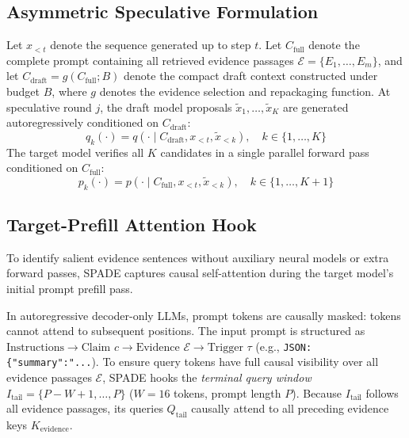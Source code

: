 \documentclass[11pt]{article}
\begin{document}
\subsection{Asymmetric Speculative Formulation}
Let $x_{<t}$ denote the sequence generated up to step $t$. Let $C_{\text{full}}$ denote the complete prompt containing all retrieved evidence passages $\mathcal{E} = \{E_1, \dots, E_m\}$, and let $C_{\text{draft}} = g(C_{\text{full}}; B)$ denote the compact draft context constructed under budget $B$, where $g$ denotes the evidence selection and repackaging function.
At speculative round $j$, the draft model proposals $\tilde{x}_1, \dots, \tilde{x}_K$ are generated autoregressively conditioned on $C_{\text{draft}}$:
\begin{equation}
q_k(\cdot) = q(\cdot \mid C_{\text{draft}}, x_{<t}, \tilde{x}_{<k}), \quad k \in \{1, \dots, K\}
\end{equation}
The target model verifies all $K$ candidates in a single parallel forward pass conditioned on $C_{\text{full}}$:
\begin{equation}
p_k(\cdot) = p(\cdot \mid C_{\text{full}}, x_{<t}, \tilde{x}_{<k}), \quad k \in \{1, \dots, K+1\}
\end{equation}

\subsection{Target-Prefill Attention Hook}
To identify salient evidence sentences without auxiliary neural models or extra forward passes, SPADE captures causal self-attention during the target model's initial prompt prefill pass.

In autoregressive decoder-only LLMs, prompt tokens are causally masked: tokens cannot attend to subsequent positions. The input prompt is structured as $\text{Instructions} \to \text{Claim } c \to \text{Evidence } \mathcal{E} \to \text{Trigger } \tau$ (e.g., \texttt{JSON: \{"summary":"...}). To ensure query tokens have full causal visibility over all evidence passages $\mathcal{E}$, SPADE hooks the \textit{terminal query window} $I_{\text{tail}} = \{P - W + 1, \dots, P\}$ ($W=16$ tokens, prompt length $P$). Because $I_{\text{tail}}$ follows all evidence passages, its queries $Q_{\text{tail}}$ causally attend to all preceding evidence keys $K_{\text{evidence}}$.
\end{document}
